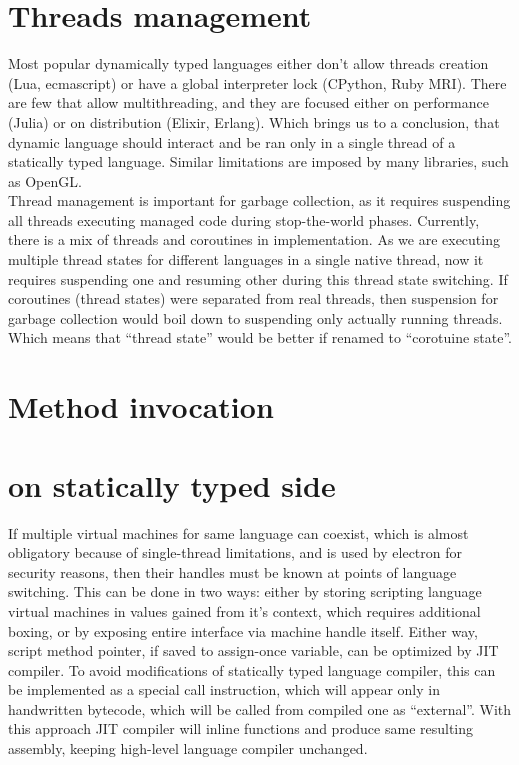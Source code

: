 \documentclass[times, %
	specification,annotation, %
	titlepage-extra-ru,specification-extra-ru,annotation-extra-ru, %
	languages={russian,english} %
	]{itmo-student-thesis}
\begin{document}
\section{Threads management} \label{sec:thread-management}
Most popular dynamically typed languages either don't allow threads creation (Lua, ecmascript) or have a global interpreter lock (CPython, Ruby MRI). There are few that allow multithreading, and they are focused either on performance (Julia) or on distribution (Elixir, Erlang). Which brings us to a conclusion, that dynamic language should interact and be ran only in a single thread of a statically typed language. Similar limitations are imposed by many libraries, such as OpenGL.\\
Thread management is important for garbage collection, as it requires suspending all threads executing managed code during stop-the-world phases. Currently, there is a mix of threads and coroutines in implementation. As we are executing multiple thread states for different languages in a single native thread, now it requires suspending one and resuming other during this thread state switching. If coroutines (thread states) were separated from real threads, then suspension for garbage collection would boil down to suspending only actually running threads. Which means that ``thread state'' would be better if renamed to ``corotuine state''.

\section{Method invocation}

\section{on statically typed side}
If multiple virtual machines for same language can coexist, which is almost obligatory because of single-thread limitations, and is used by electron for security reasons, then their handles must be known at points of language switching. This can be done in two ways: either by storing scripting language virtual machines in values gained from it's context, which requires additional boxing, or by exposing entire interface via machine handle itself. Either way, script method pointer, if saved to assign-once variable, can be optimized by JIT compiler. To avoid modifications of statically typed language compiler, this can be implemented as a special call instruction, which will appear only in handwritten bytecode, which will be called from compiled one as ``external''. With this approach JIT compiler will inline functions and produce same resulting assembly, keeping high-level language compiler unchanged.
\end{document}

